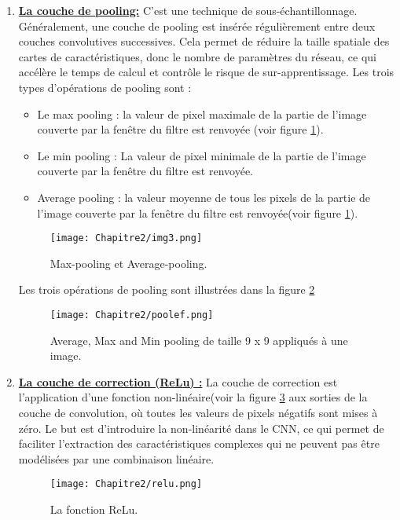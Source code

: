 \begin{enumerate}
\item \underline{\textbf{La couche de pooling:}}
C'est une technique de sous-échantillonnage. Généralement, une couche de pooling est insérée régulièrement entre deux couches convolutives successives.  Cela permet de réduire la taille spatiale des cartes de caractéristiques, donc le nombre de paramètres du réseau, ce qui accélère le temps de calcul et contrôle le risque de sur-apprentissage. 
Les trois types d'opérations de pooling sont :
\begin{itemize}
\item Le max pooling : la valeur de pixel maximale de la partie de l'image couverte par la fenêtre du filtre est renvoyée (voir figure \ref{pool}).
\item Le min pooling : La valeur de pixel minimale  de la partie de l'image couverte par la fenêtre du filtre est renvoyée.
\item Average pooling : la valeur moyenne de tous les pixels  de la partie de l'image couverte par la fenêtre du filtre est renvoyée(voir figure \ref{pool}).
\end{itemize}
 
     \begin{figure}[H]
          \centering
          \texttt{[image: Chapitre2/img3.png]}
          \caption{Max-pooling et Average-pooling.}
          \label{pool}
          \end{figure}

Les trois opérations de pooling sont illustrées dans la figure \ref{poolef}

\begin{figure}[H]
\centering
\texttt{[image: Chapitre2/poolef.png]}
\caption{Average, Max and Min pooling de taille 9 x 9 appliqués à une image.}
\label{poolef}
\end{figure}

\item \underline{\textbf{La couche de correction (ReLu) :}}
La couche de correction est l'application d'une fonction non-linéaire(voir la figure \ref{relu} aux sorties de la couche de convolution, où toutes les valeurs de pixels négatifs sont mises à zéro. Le but est d'introduire la non-linéarité dans le CNN, ce qui permet de faciliter l'extraction des caractéristiques complexes qui ne peuvent pas être modélisées par une combinaison linéaire.

\begin{figure}[H]
\centering
\texttt{[image: Chapitre2/relu.png]}
\caption{La fonction ReLu.}
\label{relu}
\end{figure}


\end{enumerate}
